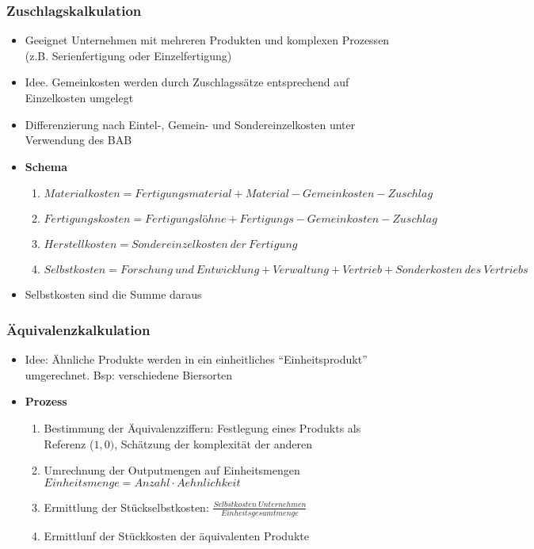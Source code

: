\subsubsection{Zuschlagskalkulation}
\begin{itemize}
	\item Geeignet Unternehmen mit mehreren Produkten und komplexen Prozessen (z.B. Serienfertigung oder Einzelfertigung)
	\item Idee. Gemeinkosten werden durch Zuschlagssätze entsprechend auf Einzelkosten umgelegt
	\item Differenzierung nach Eintel-, Gemein- und Sondereinzelkosten unter Verwendung des BAB
	\item \textbf{Schema}
	\begin{enumerate}
		\item \(Materialkosten = Fertigungsmaterial + Material-Gemeinkosten-Zuschlag\)
		\item \(Fertigungskosten = Fertigungslöhne + Fertigungs-Gemeinkosten-Zuschlag\)
		\item \(Herstellkosten = Sondereinzelkosten~der~Fertigung\)
		\item \(Selbstkosten = Forschung~und~Entwicklung+Verwaltung + Vertrieb + Sonderkosten~des~Vertriebs\)
	\end{enumerate}
	\item Selbstkosten sind die Summe daraus
\end{itemize}

\subsubsection{Äquivalenzkalkulation}
\begin{itemize}
	\item Idee: Ähnliche Produkte werden in ein einheitliches "`Einheitsprodukt"' umgerechnet. Bsp: verschiedene Biersorten
	\item \textbf{Prozess}
	\begin{enumerate}
		\item Bestimmung der Äquivalenzziffern: Festlegung eines Produkts als Referenz (\(1,0)\), Schätzung der komplexität der anderen
		\item Umrechnung der Outputmengen auf Einheitsmengen \(Einheitsmenge = Anzahl \cdot Aehnlichkeit\)
		\item Ermittlung der Stückselbstkosten: \(\frac{Selbstkosten~Unternehmen}{Einheitsgesamtmenge}\)
		\item Ermittlunf der Stückkosten der äquivalenten Produkte
	\end{enumerate}
\end{itemize}

